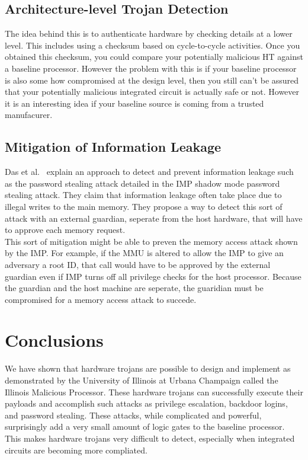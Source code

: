 \documentclass[letterpaper,twocolumn,11pt]{article}
\begin{document}
\subsection{Architecture-level Trojan Detection}
The idea behind this is to authenticate hardware by checking details at a lower level. This includes using a checksum based on cycle-to-cycle activities. Once you obtained this checksum, you could compare your potentially malicious HT against a baseline processor. However the problem with this is if your baseline processor is also some how compromised at the design level, then you still can't be assured that your potentially malicious integrated circuit is actually safe or not. However it is an interesting idea if your baseline source is coming from a trusted manufacurer.

\subsection{Mitigation of Information Leakage}
Das et al.~\cite {das} explain an approach to detect and prevent information leakage such as the password stealing attack detailed in the IMP shadow mode password stealing attack. They claim that information leakage often take place due to illegal writes to the main memory. They propose a way to detect this sort of attack with an external guardian, seperate from the host hardware, that will have to approve each memory request. \\

This sort of mitigation might be able to preven the memory access attack shown by the IMP. For example, if the MMU is altered to allow the IMP to give an adversary a root ID, that call would have to be approved by the external guardian even if IMP turns off all privilege checks for the host processor. Because the guardian and the host machine are seperate, the guaridian must be compromised for a memory access attack to succede.

\section{Conclusions}
We have shown that hardware trojans are possible to design and implement as demonstrated by the University of Illinois at Urbana Champaign called the Illinois Malicious Processor. These hardware trojans can successfully execute their payloads and accomplish such attacks as privilege escalation, backdoor logins, and password stealing. These attacks, while complicated and powerful, surprisingly add a very small amount of logic gates to the baseline processor. This makes hardware trojans very difficult to detect, especially when integrated circuits are becoming more compliated. \\
\end{document}
